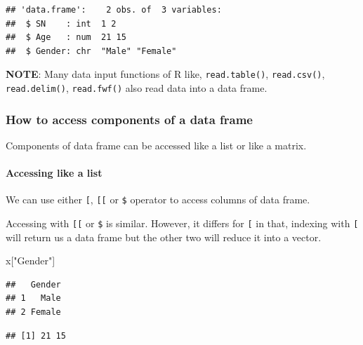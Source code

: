 \documentclass[
]{book}
\newenvironment{Shaded}{\begin{snugshade}}{\end{snugshade}}
\newcommand{\NormalTok}[1]{#1}
\newcommand{\SpecialCharTok}[1]{\textcolor[rgb]{0.00,0.00,0.00}{#1}}
\newcommand{\StringTok}[1]{\textcolor[rgb]{0.31,0.60,0.02}{#1}}
\theoremstyle{definition}
\theoremstyle{definition}
\theoremstyle{definition}
\theoremstyle{definition}
\theoremstyle{remark}
\begin{document}
\begin{verbatim}
## 'data.frame':    2 obs. of  3 variables:
##  $ SN    : int  1 2
##  $ Age   : num  21 15
##  $ Gender: chr  "Male" "Female"
\end{verbatim}

\textbf{NOTE}: Many data input functions of R like, \texttt{read.table()}, \texttt{read.csv()}, \texttt{read.delim()}, \texttt{read.fwf()} also read data into a data frame.

\hypertarget{how-to-access-components-of-a-data-frame}{%
\subsubsection{How to access components of a data frame}\label{how-to-access-components-of-a-data-frame}}

Components of data frame can be accessed like a list or like a matrix.

\hypertarget{accessing-like-a-list}{%
\paragraph{Accessing like a list}\label{accessing-like-a-list}}

We can use either \texttt{{[}}, \texttt{{[}{[}} or \texttt{\$} operator to access columns of data frame.

Accessing with \texttt{{[}{[}} or \texttt{\$} is similar. However, it differs for \texttt{{[}} in that, indexing with \texttt{{[}} will return us a data frame but the other two will reduce it into a vector.

\begin{Shaded}
\begin{Highlighting}[]
\NormalTok{x[}\StringTok{"Gender"}\NormalTok{]}
\end{Highlighting}
\end{Shaded}

\begin{verbatim}
##   Gender
## 1   Male
## 2 Female
\end{verbatim}

\begin{Shaded}
\end{Shaded}

\begin{verbatim}
## [1] 21 15
\end{verbatim}
\end{document}
